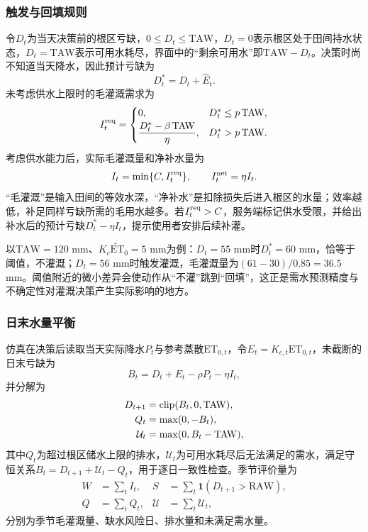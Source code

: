 \subsubsection{触发与回填规则}
令$D_t$为当天决策前的根区亏缺，$0\le D_t\le\mathrm{TAW}$，$D_t=0$表示根区处于田间持水状态，$D_t=\mathrm{TAW}$表示可用水耗尽，界面中的“剩余可用水”即$\mathrm{TAW}-D_t$。决策时尚不知道当天降水，因此预计亏缺为
\begin{equation}\label{eq:projected}
D_t^*=D_t+\widehat E_t.
\end{equation}
未考虑供水上限时的毛灌溉需求为
\begin{equation}\label{eq:requirement}
I_t^{\rm req}=\begin{cases}
0,&D_t^*\le p\,\mathrm{TAW},\\[2pt]
\dfrac{D_t^*-\beta\,\mathrm{TAW}}{\eta},&D_t^*>p\,\mathrm{TAW}.
\end{cases}
\end{equation}
考虑供水能力后，实际毛灌溉量和净补水量为
\begin{equation}\label{eq:capacity}
I_t=\min\{C,I_t^{\rm req}\},\qquad I_t^{\rm net}=\eta I_t.
\end{equation}
“毛灌溉”是输入田间的等效水深，“净补水”是扣除损失后进入根区的水量；效率越低，补足同样亏缺所需的毛用水越多。若$I_t^{\rm req}>C$，服务端标记供水受限，并给出补水后的预计亏缺$D_t^*-\eta I_t$，提示使用者安排后续补灌。

以$\mathrm{TAW}=120$ mm、$K_c\widetilde{\mathrm{ET}}_0=5$ mm为例：$D_t=55$ mm时$D_t^*=60$ mm，恰等于阈值，不灌溉；$D_t=56$ mm时触发灌溉，毛灌溉量为$(61-30)/0.85=36.5$ mm。阈值附近的微小差异会使动作从“不灌”跳到“回填”，这正是需水预测精度与不确定性对灌溉决策产生实际影响的地方。

\subsubsection{日末水量平衡}
仿真在决策后读取当天实际降水$P_t$与参考蒸散$\mathrm{ET}_{0,t}$，令$E_t=K_{c,t}\mathrm{ET}_{0,t}$，未截断的日末亏缺为
\begin{equation}\label{eq:balance}
B_t=D_t+E_t-\rho P_t-\eta I_t,
\end{equation}
并分解为
\begin{align}
D_{t+1}&=\operatorname{clip}(B_t,0,\mathrm{TAW}),\label{eq:clip}\\
Q_t&=\max(0,-B_t),\label{eq:drain}\\
\mathcal U_t&=\max(0,B_t-\mathrm{TAW}),\label{eq:unmet}
\end{align}
其中$Q_t$为超过根区储水上限的排水，$\mathcal U_t$为可用水耗尽后无法满足的需水，满足守恒关系$B_t=D_{t+1}+\mathcal U_t-Q_t$，用于逐日一致性检查。季节评价量为
\begin{align}
W&=\sum_t I_t,&S&=\sum_t\mathbf 1(D_{t+1}>\mathrm{RAW}),\\
Q&=\sum_t Q_t,&\mathcal U&=\sum_t \mathcal U_t,
\end{align}
分别为季节毛灌溉量、缺水风险日、排水量和未满足需水量。

